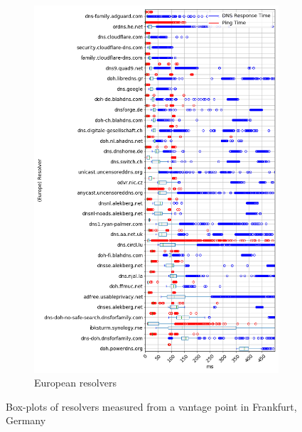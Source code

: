 \begin{figure}[t!]
\begin{subfigure}[t]{0.5\textwidth}
        \includegraphics[width=\linewidth]{figures/Frankfurt_Europe.png}
        \caption{European resolvers}
    \end{subfigure}

    \caption{Box-plots of resolvers measured from a vantage point in Frankfurt, Germany}
\end{figure}




